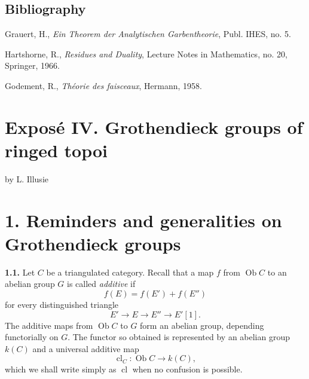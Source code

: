 \documentclass[11pt]{article}
\newcommand{\cl}{\operatorname{cl}}
\begin{document}
\subsection*{Bibliography}
\begin{enumerate}[label={[\arabic*]}]
\item Grauert, H., \emph{Ein Theorem der Analytischen Garbentheorie}, Publ. IHES, no. 5.
\item Hartshorne, R., \emph{Residues and Duality}, Lecture Notes in Mathematics, no. 20, Springer, 1966.
\item Godement, R., \emph{Théorie des faisceaux}, Hermann, 1958.
\end{enumerate}



\providecommand{\Ob}{\operatorname{Ob}}
\providecommand{\Mod}{\operatorname{Mod}}
\providecommand{\Coh}{\operatorname{Coh}}
\providecommand{\Loclib}{\operatorname{Loclib}}
\providecommand{\coh}{\mathrm{coh}}
\providecommand{\parf}{\mathrm{parf}}
\providecommand{\naif}{\mathrm{naif}}
\providecommand{\loc}{\mathrm{loc}}
\providecommand{\fin}{\mathrm{fin}}
\providecommand{\clA}{\operatorname{cl}}
\providecommand{\Rg}{\operatorname{rg}}
\providecommand{\varinjlim}{\varinjlim}
\providecommand{\varprojlim}{\varprojlim}
\providecommand{\id}{\operatorname{id}}
\providecommand{\Th}{\operatorname{Th}}
\providecommand{\Hom}{\operatorname{Hom}}
\providecommand{\Dcat}{\mathrm D}
\providecommand{\Kcat}{\mathrm K}
\providecommand{\Kdot}{K_{\bullet}}
\providecommand{\Kprime}{K'}
\providecommand{\naif}{\mathrm{na\ddot{\i}f}}


\section*{Exposé IV. Grothendieck groups of ringed topoi}
\begin{center}
by L. Illusie
\end{center}

\section*{1. Reminders and generalities on Grothendieck groups}

\textbf{1.1.} Let \(C\) be a triangulated category. Recall that a map \(f\) from \(\Ob C\) to an abelian group \(G\) is called \emph{additive} if
\[
 f(E)=f(E')+f(E'')
\]
for every distinguished triangle
\[
 E'\longrightarrow E\longrightarrow E''\longrightarrow E'[1].
\]
The additive maps from \(\Ob C\) to \(G\) form an abelian group, depending functorially on \(G\). The functor so obtained is represented by an abelian group \(k(C)\) and a universal additive map
\[
 \cl_C:\Ob C\longrightarrow k(C),
\]
which we shall write simply as \(\cl\) when no confusion is possible.
\end{document}
